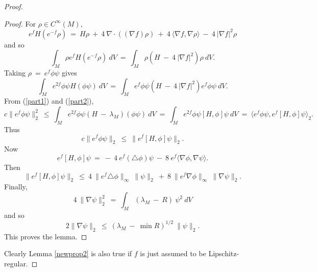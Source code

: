 \documentclass[12pt]{amsart}
\numberwithin{equation}{section}
\theoremstyle{plain}
\theoremstyle{definition}
\theoremstyle{remark}
\begin{document}
\begin{proof}
\begin{proof}
For $\rho \in C^\infty(M)$,
\begin{equation} \label{Hf}
e^f H (e^{-f} \rho) \: = \: H \rho \: + \: 4 \: \nabla \cdot 
((\nabla f) \rho) \: + \: 4 \: \langle \nabla f, \nabla \rho \rangle
\: - \: 4 \: |\nabla f|^2 \rho
\end{equation}
and so
\begin{equation}
\int_M \rho e^f H(e^{-f} \rho) \: dV \: = \:
\int_M \rho (H \: - \: 4 \: |\nabla f|^2) \rho \: dV.
\end{equation}
Taking $\rho \: = \: e^f \phi \psi$ gives
\begin{equation} \label{part2}
\int_M e^{2f} \phi \psi H(\phi \psi) \: dV \: = \:
\int_M e^f \phi \psi (H \: - \: 4 \: 
|\nabla f|^2)  e^{f} \phi \psi \: dV.
\end{equation}
From (\ref{part1}) and (\ref{part2}),
\begin{equation}
c \|e^f \phi \psi \|_2^2 \: \le \:
\int_M e^{2f} \phi \psi (H \: - \: \lambda_M) (\phi \psi) \: dV \: = \:
\int_M e^{2f} \phi \psi [H, \phi] \psi \: dV \: = \:
\langle e^{f} \phi \psi, e^{f} [H, \phi] \psi \rangle_2.
\end{equation}
Thus
\begin{equation}
c \|e^f \phi \psi \|_2 \: \le \:
\|e^{f} [H, \phi] \psi\|_2.
\end{equation}
Now
\begin{equation}
e^{f} [H, \phi] \psi \: = \: - \: 4 \: e^f (\triangle \phi) \psi \: - \:
8 \: e^f \langle \nabla\phi, \nabla \psi \rangle.
\end{equation}
Then 
\begin{equation}
\|e^{f} [H, \phi] \psi\|_2 \: \le \:
4 \: \|e^f \triangle \phi\|_\infty \: \|\psi\|_2 \: + \: 8 \:
\|e^f \nabla\phi\|_\infty \: \|\nabla \psi\|_2.
\end{equation}
Finally,
\begin{equation}
4 \: \|\nabla \psi\|_2^2 \: = \: \int_M (\lambda_M \: - \: R) \: \psi^2 \:
dV
\end{equation}
and so
\begin{equation}
2 \|\nabla \psi\|_2 \: \le \: (\lambda_M \: - \: \min R)^{1/2} \:
\|\psi\|_2.
\end{equation}
This proves the lemma.
\end{proof}

Clearly Lemma \ref{newprop2} is also true if 
$f$ is just assumed to be Lipschitz-regular.


\end{proof}
\end{document}
